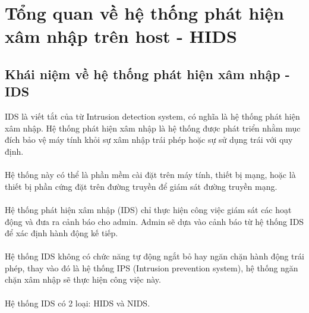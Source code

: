\section{Tổng quan về hệ thống phát hiện xâm nhập trên host - HIDS}
\subsection{Khái niệm về hệ thống phát hiện xâm nhập - IDS}
   IDS là viết tắt của từ Intrusion detection system, có nghĩa là hệ thống phát
  hiện xâm nhập. Hệ thống phát hiện xâm nhập là hệ thống được phát triển nhằm
  mục đích bảo vệ máy tính khỏi sự xâm nhập trái phép hoặc sự sử dụng trái với
  quy định.\\\\ 
   Hệ thống này có thể là phần mềm cài đặt trên máy tính, thiết bị mạng, hoặc là
   thiết bị phần cứng đặt trên đường truyền để giám sát đường truyền
   mạng.\\\\ 
Hệ thống phát hiện xâm nhập (IDS) chỉ thực hiện công việc giám sát các hoạt động
và đưa ra cảnh báo cho admin. Admin sẽ dựa vào cảnh báo từ hệ thống IDS để xác
định hành động kế tiếp.\\\\ 
 Hệ thống IDS không có chức năng tự động ngắt bỏ hay ngăn chặn hành động trái
 phép, thay vào đó là hệ thống IPS (Intrusion prevention system), hệ thống ngăn
 chặn xâm nhập sẽ thực hiện công việc này.\\\\ 
 Hệ thống IDS có 2 loại: HIDS và NIDS.

